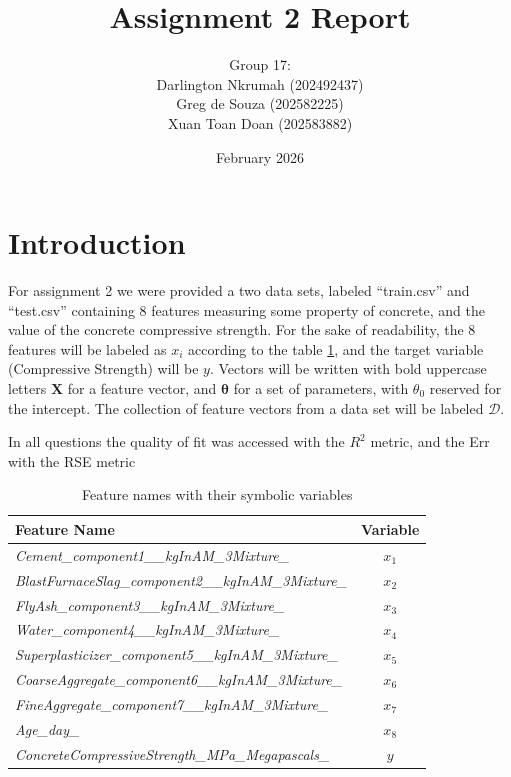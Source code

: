 \documentclass{article}
\title{Assignment 2 Report}
\author{Group 17: \\ Darlington Nkrumah (202492437) \\
  Greg de Souza (202582225) \\
  Xuan Toan Doan (202583882)}
\date{February 2026}
\renewcommand{\b}[1]{\mathbf{#1}}
\begin{document}
\maketitle

\section*{Introduction}

For assignment 2 we were provided a two data sets, labeled ``train.csv''
and ``test.csv'' containing 8 features measuring some property of concrete,
and the value of the concrete compressive strength. For the sake of readability,
the 8 features will be labeled as $x_i$ according to the table \ref{tab:featvar},
and the target variable (Compressive Strength) will be $y$. Vectors
will be written with bold uppercase letters $\b{X}$ for a feature vector,
and $\b{\theta}$ for a set of parameters, with $\theta_0$ reserved for the intercept.
The collection of feature vectors from a
data set will be labeled $\mathcal{D}$.

In all questions the quality of fit was accessed with the $R^2$ metric, and the Err with the RSE metric

\begin{table}[h!]
  \centering
  \begin{tabular}{lc}
    \textbf{Feature Name}                              & \textbf{Variable} \\ \hline
   \textit{ Cement\_component1\_\_kgInAM\_3Mixture\_}           & $x_1$             \\
    \textit{BlastFurnaceSlag\_component2\_\_kgInAM\_3Mixture\_} & $x_2$             \\
    \textit{FlyAsh\_component3\_\_kgInAM\_3Mixture\_ }          & $x_3$             \\
    \textit{Water\_component4\_\_kgInAM\_3Mixture\_}            & $x_4$             \\
    \textit{Superplasticizer\_component5\_\_kgInAM\_3Mixture\_} & $x_5$             \\
    \textit{CoarseAggregate\_component6\_\_kgInAM\_3Mixture\_}  & $x_6$             \\
    \textit{FineAggregate\_component7\_\_kgInAM\_3Mixture\_}   & $x_7$             \\
    \textit{Age\_day\_}                                         & $x_8$             \\ \hline
    \textit{ConcreteCompressiveStrength\_MPa\_Megapascals\_}    & $y$                
  \end{tabular}
  \caption{Feature names with their symbolic variables}
  \label{tab:featvar}
\end{table}
\end{document}
